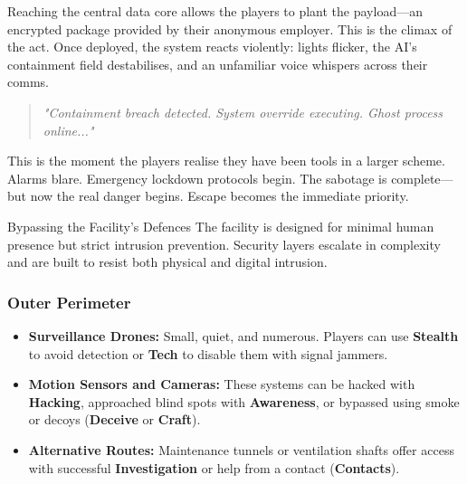 \documentclass[nodeprecatedcode,bg=print]{dndbook}
\begin{document}
\begin{multicols}{2}


Reaching the central data core allows the players to plant the payload—an encrypted package provided by their anonymous employer. This is the climax of the act. Once deployed, the system reacts violently: lights flicker, the AI's containment field destabilises, and an unfamiliar voice whispers across their comms.

\vspace{0.5\baselineskip}
\begin{quote}
\textit{"Containment breach detected. System override executing. Ghost process online..."}  
\end{quote}
\vspace{0.5\baselineskip}

This is the moment the players realise they have been tools in a larger scheme. Alarms blare. Emergency lockdown protocols begin. The sabotage is complete—but now the real danger begins. Escape becomes the immediate priority.

\begin{CommentBox}{Bypassing the Facility’s Defences}
    The facility is designed for minimal human presence but strict intrusion prevention. Security layers escalate in complexity and are built to resist both physical and digital intrusion.
    
    \vspace{0.5\baselineskip}
    
    \subsubsection*{Outer Perimeter}
    \begin{itemize}
        \item \textbf{Surveillance Drones:} Small, quiet, and numerous. Players can use \textbf{Stealth} to avoid detection or \textbf{Tech} to disable them with signal jammers.
        \item \textbf{Motion Sensors and Cameras:} These systems can be hacked with \textbf{Hacking}, approached blind spots with \textbf{Awareness}, or bypassed using smoke or decoys (\textbf{Deceive} or \textbf{Craft}).
        \item \textbf{Alternative Routes:} Maintenance tunnels or ventilation shafts offer access with successful \textbf{Investigation} or help from a contact (\textbf{Contacts}).
    \end{itemize}
    

\end{CommentBox}
\end{multicols}
\end{document}
